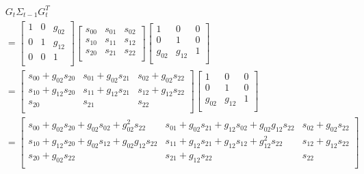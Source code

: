 \documentclass[oneside, 12pt, a4paper]{book}
\begin{document}
\begin{equation}
    \begin{split}
        &G_t \Sigma_{t-1} G_t^T \\
        &= \begin{bmatrix}
            1 & 0 & g_{02} \\
            0 & 1 & g_{12} \\
            0 & 0 & 1 \\ 
        \end{bmatrix}
        \begin{bmatrix}
            s_{00} & s_{01} & s_{02}\\
            s_{10} & s_{11} & s_{12}\\
            s_{20} & s_{21} & s_{22}\\ 
        \end{bmatrix}
        \begin{bmatrix}
            1 & 0 & 0\\
            0 & 1 & 0\\
            g_{02} & g_{12} & 1\\ 
        \end{bmatrix}\\
        &= 
        \begin{bmatrix}
            s_{00}+g_{02}s_{20} & s_{01} + g_{02}s_{21} & s_{02} + g_{02}s_{22}\\
            s_{10} + g_{12}s_{20} & s_{11} + g_{12}s_{21} & s_{12} + g_{12}s_{22}\\
            s_{20} & s_{21} & s_{22}\\
        \end{bmatrix}
        \begin{bmatrix}
            1 & 0 & 0\\
            0 & 1 & 0\\
            g_{02} & g_{12} & 1\\ 
        \end{bmatrix}\\
        &= \begin{bmatrix}
            s_{00}+ g_{02}s_{20} + g_{02}s_{02} + g_{02}^2s_{22}& s_{01} + g_{02}s_{21} + g_{12}s_{02} + g_{02}g_{12}s_{22}& s_{02} + g_{02}s_{22}\\
            s_{10} + g_{12}s_{20} + g_{02}s_{12} + g_{02}g_{12}s_{22} & s_{11} + g_{12}s_{21} + g_{12}s_{12} + g_{12}^2s_{22}& s_{12} + g_{12}s_{22}\\
            s_{20} + g_{02}s_{22} & s_{21} + g_{12}s_{22} & s_{22}\\

\end{bmatrix}
\end{split}
\end{equation}
\end{document}
